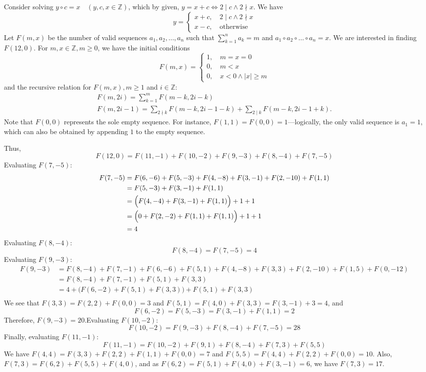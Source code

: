 \begin{enumerate}
Consider solving $y\circ c =x\quad (y,c,x\in \mathbb{Z})$, which by given, $y=x+c\iff 2\mid c\land 2\nmid x$. We have
 \[y = \begin{cases}x+c, \quad 2\mid c\land 2\nmid x\\x-c,\quad \text{otherwise}\end{cases}\]Let $F(m,x)$ be the number of valid sequences $a_1,a_2,\ldots,a_n$ such that $\sum_{k=1}^n a_k=m$ and $a_1\circ a_2\circ\ldots\circ a_n=x$. We are interested in finding $F(12,0)$. For $m,x\in\mathbb{Z},m\ge 0$, we have the initial conditions
 \[F(m,x) = \begin{cases}1, \quad m=x=0\\0, \quad m<x\\0,\quad x<0\land \lvert x\rvert \ge m\end{cases}\]and the recursive relation for $F(m,x), m\ge 1$ and $i\in \mathbb{Z}$:\begin{gather*}F(m, 2i)=\sum_{k=1}^{m}F(m-k, 2i-k)\\F(m, 2i-1)=\sum_{2\nmid k}F(m-k,2i-1-k)+\sum_{2\mid k}F(m-k,2i-1+k).\end{gather*}Note that $F(0,0)$ represents the sole empty sequence. For instance, $F(1,1)=F(0,0)=1$—logically, the only valid sequence is $a_1=1$, which can also be obtained by appending $1$ to the empty sequence.

 
Thus, 
 \[F(12,0)=F(11,-1)+F(10,-2)+F(9,-3)+F(8,-4)+F(7,-5)\]Evaluating $F(7,-5)$:\begin{align*}F(7,-5)&=F(6,-6)+F(5,-3)+F(4,-8)+F(3,-1)+F(2,-10)+F(1,1)\\&=F(5,-3)+F(3,-1)+F(1,1)\\&=\Bigl(F(4,-4)+F(3,-1)+F(1,1)\Bigr)+1+1\\&=\Bigl(0+F(2,-2)+F(1,1)+F(1,1)\Bigr)+1+1\\&=4\end{align*}
Evaluating $F(8,-4)$:
 \[F(8,-4)=F(7,-5)=4\]Evaluating $F(9,-3)$:\begin{align*}F(9,-3)&=F(8,-4)+F(7,-1)+F(6,-6)+F(5,1)+F(4,-8)+F(3,3)+F(2,-10)+F(1,5)+F(0,-12)\\&=F(8,-4)+F(7,-1)+F(5,1)+F(3,3)\\&=4+\bigl(F(6,-2)+F(5,1)+F(3,3)\bigr)+F(5,1)+F(3,3)\\\end{align*}
We see that $F(3,3)=F(2,2)+F(0,0)=3$ and $F(5,1)=F(4,0)+F(3,3)=F(3,-1)+3=4$, and
 \[F(6,-2)=F(5,-3)=F(3,-1)+F(1,1)=2\]Therefore, $F(9,-3)=20$.Evaluating $F(10,-2)$:
 \[F(10,-2)=F(9,-3)+F(8,-4)+F(7,-5)=28\]Finally, evaluating $F(11,-1)$:
 \[F(11,-1)=F(10,-2)+F(9,1)+F(8,-4)+F(7,3)+F(5,5)\]We have $F(4,4)=F(3,3)+F(2,2)+F(1,1)+F(0,0)=7$ and $F(5,5)=F(4,4)+F(2,2)+F(0,0)=10$. Also, $F(7,3)=F(6,2)+F(5,5)+F(4,0)$, and as $F(6,2)=F(5,1)+F(4,0)+F(3,-1)=6$, we have $F(7,3)=17$. 


\end{enumerate}
